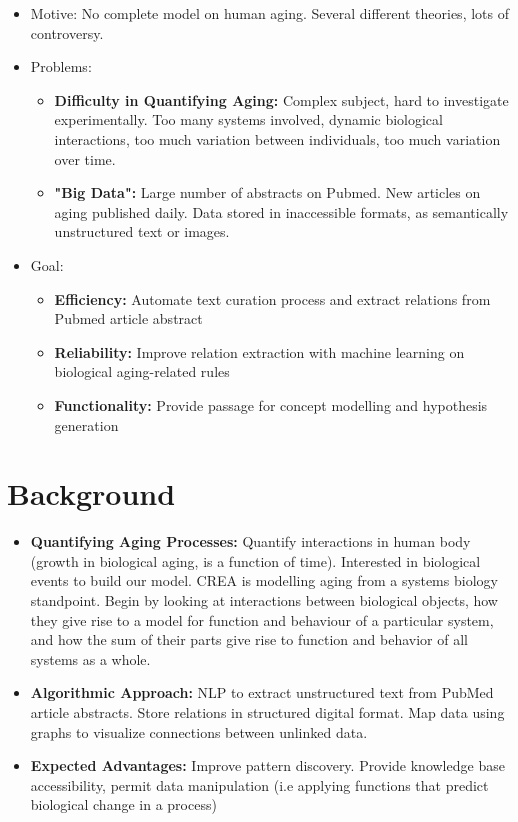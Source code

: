 \documentclass[11pt]{article}
\begin{document}
\begin{itemize}
\item Motive: No complete model on human aging. Several different theories, lots of controversy.
\item Problems:
	\begin{itemize}
		\item \textbf{Difficulty in Quantifying Aging:} Complex subject, hard to investigate experimentally. Too many systems involved, dynamic biological interactions, too much variation between individuals, too much variation over time.
		\item \textbf{"Big Data":} Large number of abstracts on Pubmed. New articles on aging published daily. Data stored in inaccessible formats, as semantically unstructured text or images. 
	\end{itemize}
\item Goal: 
	\begin{itemize}
		\item \textbf{Efficiency:} Automate text curation process and extract relations from Pubmed article abstract 
		\item \textbf{Reliability:} Improve relation extraction with machine learning on biological aging-related rules 
		\item \textbf{Functionality:} Provide passage for concept modelling and hypothesis generation
	\end{itemize}
\end{itemize}

\section{Background}

\begin{itemize}
\item \textbf{Quantifying Aging Processes:} Quantify interactions in human body (growth in biological aging, is a function of time). Interested in biological events to build our model. CREA is modelling aging from a systems biology standpoint. Begin by looking at interactions between biological objects, how they give rise to a model for function and behaviour of a particular system, and how the sum of their parts give rise to function and behavior of all systems as a whole.  
\item \textbf{Algorithmic Approach:} NLP to extract unstructured text from PubMed article abstracts. Store relations in structured digital format. Map data using graphs to visualize connections between unlinked data.
\item \textbf{Expected Advantages:} Improve pattern discovery. Provide knowledge base accessibility, permit data manipulation (i.e applying functions that predict biological change in a process)
\end{itemize}
\end{document}
